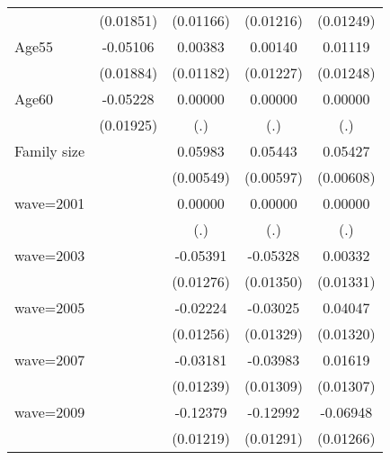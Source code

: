 {\begin{longtable}{l*{4}{c}}
                    &   (0.01851)         &   (0.01166)         &   (0.01216)         &   (0.01249)         \\
\addlinespace
Age55               &    -0.05106\sym{***}&     0.00383         &     0.00140         &     0.01119         \\
                    &   (0.01884)         &   (0.01182)         &   (0.01227)         &   (0.01248)         \\
\addlinespace
Age60               &    -0.05228\sym{***}&     0.00000         &     0.00000         &     0.00000         \\
                    &   (0.01925)         &         (.)         &         (.)         &         (.)         \\
\addlinespace
Family size         &                     &     0.05983\sym{***}&     0.05443\sym{***}&     0.05427\sym{***}\\
                    &                     &   (0.00549)         &   (0.00597)         &   (0.00608)         \\
\addlinespace
wave=2001           &                     &     0.00000         &     0.00000         &     0.00000         \\
                    &                     &         (.)         &         (.)         &         (.)         \\
\addlinespace
wave=2003           &                     &    -0.05391\sym{***}&    -0.05328\sym{***}&     0.00332         \\
                    &                     &   (0.01276)         &   (0.01350)         &   (0.01331)         \\
\addlinespace
wave=2005           &                     &    -0.02224\sym{*}  &    -0.03025\sym{**} &     0.04047\sym{***}\\
                    &                     &   (0.01256)         &   (0.01329)         &   (0.01320)         \\
\addlinespace
wave=2007           &                     &    -0.03181\sym{**} &    -0.03983\sym{***}&     0.01619         \\
                    &                     &   (0.01239)         &   (0.01309)         &   (0.01307)         \\
\addlinespace
wave=2009           &                     &    -0.12379\sym{***}&    -0.12992\sym{***}&    -0.06948\sym{***}\\
                    &                     &   (0.01219)         &   (0.01291)         &   (0.01266)         \\

\end{longtable}}
